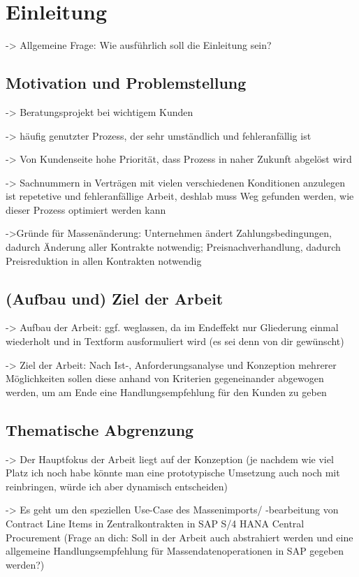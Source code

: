 \chapter{Einleitung}

-> Allgemeine Frage: Wie ausführlich soll die Einleitung sein?

\section{Motivation und Problemstellung}

-> Beratungsprojekt bei wichtigem Kunden

-> häufig genutzter Prozess, der sehr umständlich und fehleranfällig ist

-> Von Kundenseite hohe Priorität, dass Prozess in naher Zukunft abgelöst wird

-> Sachnummern in Verträgen mit vielen verschiedenen Konditionen anzulegen ist repetetive und fehleranfällige Arbeit, deshlab muss Weg gefunden werden, wie dieser Prozess optimiert werden kann

->Gründe für Massenänderung: Unternehmen ändert Zahlungsbedingungen, dadurch Änderung aller Kontrakte notwendig; Preisnachverhandlung, dadurch Preisreduktion in allen Kontrakten notwendig

\section{(Aufbau und) Ziel der Arbeit}

-> Aufbau der Arbeit: ggf. weglassen, da im Endeffekt nur Gliederung einmal wiederholt und in Textform ausformuliert wird (es sei denn von dir gewünscht)

-> Ziel der Arbeit: Nach Ist-, Anforderungsanalyse und Konzeption mehrerer Möglichkeiten sollen diese anhand von Kriterien gegeneinander abgewogen werden, um am Ende eine Handlungsempfehlung für den Kunden zu geben

\section{Thematische Abgrenzung}

-> Der Hauptfokus der Arbeit liegt auf der Konzeption (je nachdem wie viel Platz ich noch habe könnte man eine prototypische Umsetzung auch noch mit reinbringen, würde ich aber dynamisch entscheiden)

-> Es geht um den speziellen Use-Case des Massenimports/ -bearbeitung von Contract Line Items in Zentralkontrakten in SAP S/4 HANA Central Procurement (Frage an dich: Soll in der Arbeit auch abstrahiert werden und eine allgemeine Handlungsempfehlung für Massendatenoperationen in SAP gegeben werden?)


